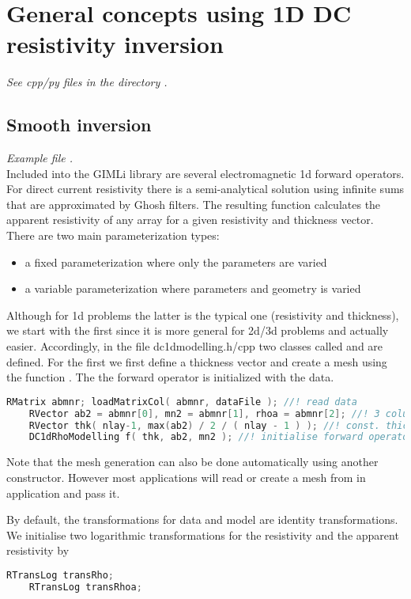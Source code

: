 \section{General concepts using 1D DC resistivity inversion}\label{sec:dc1d}
{\em See cpp/py files in the directory .}
\subsection{Smooth inversion}\label{sec:dc1dsmooth}
{\em Example file .}\\
Included into the GIMLi library are several electromagnetic 1d forward operators.
For direct current resistivity there is a semi-analytical solution using infinite sums that are approximated by Ghosh filters. 
The resulting function calculates the apparent resistivity of any array for a given resistivity and thickness vector.
There are two main parameterization types:
\begin{itemize}
	\item a fixed parameterization where only the parameters are varied 
	\item a variable parameterization where parameters and geometry is varied
\end{itemize}

Although for 1d problems the latter is the typical one (resistivity and thickness), we start with the first since it is more general for 2d/3d problems and actually easier.
Accordingly, in the file dc1dmodelling.h/cpp two classes called  and  are defined.
For the first we first define a thickness vector and create a mesh using the function .
The the forward operator is initialized with the data.

\begin{lstlisting}[language=C++]
    RMatrix abmnr; loadMatrixCol( abmnr, dataFile ); //! read data
    RVector ab2 = abmnr[0], mn2 = abmnr[1], rhoa = abmnr[2]; //! 3 columns
    RVector thk( nlay-1, max(ab2) / 2 / ( nlay - 1 ) ); //! const. thickn.
    DC1dRhoModelling f( thk, ab2, mn2 ); //! initialise forward operator
\end{lstlisting}

Note that the mesh generation can also be done automatically using another constructor.
However most applications will read or create a mesh from in application and pass it.

By default, the transformations for data and model are identity transformations.
We initialise two logarithmic transformations for the resistivity and the apparent resistivity by 
\begin{lstlisting}[language=C++]
    RTransLog transRho;
    RTransLog transRhoa;
\end{lstlisting}

